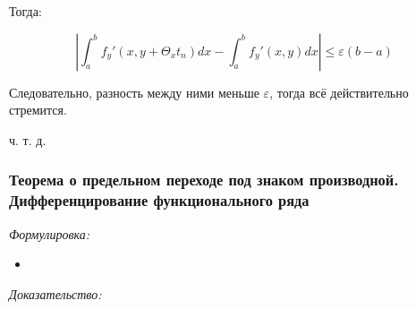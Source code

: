 \documentclass{article}
\begin{document}
Тогда: 

\[\left|\int_a^b{f_y'(x, y + \Theta_x t_n) dx} - \int_a^b{f_y'(x, y) dx}\right| \le \varepsilon (b - a)\]

Следовательно, разность между ними меньше $\varepsilon$, тогда всё действительно стремится.

ч. т. д.

\subsubsection{Теорема о предельном переходе под знаком производной. Дифференцирование функционального ряда}
\textit{Формулировка:}

\begin{itemize}
    \item 
\end{itemize}

\textit{Доказательство:}
\newpage
\end{document}
